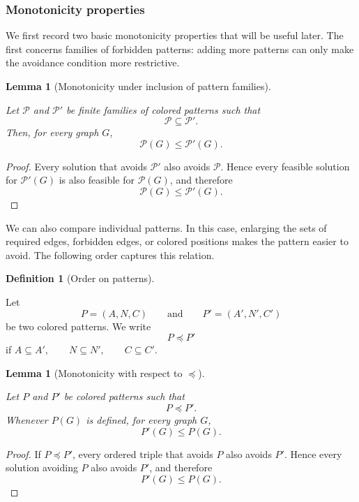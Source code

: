 \documentclass[12pt]{article}
\theoremstyle{plain}
\newtheorem{lemma}[theorem]{Lemma}
\theoremstyle{definition}
\newtheorem{definition}[theorem]{Definition}
\theoremstyle{remark}
\theoremstyle{definition}
\begin{document}
\subsubsection{Monotonicity properties}
\label{subsubsec:monotonicity}

We first record two basic monotonicity properties that will be useful later.
The first concerns families of forbidden patterns: adding more patterns can
only make the avoidance condition more restrictive.


\begin{lemma}[Monotonicity under inclusion of pattern families]
\label{lem:monotone-patterns}

Let \(\mathcal P\) and \(\mathcal P'\) be finite families of colored patterns
such that
\[
\mathcal P\subseteq\mathcal P'.
\]
Then, for every graph \(G\),
\[
\mathcal P(G)\le \mathcal P'(G).
\]
\end{lemma}

\begin{proof}
Every solution that avoids \(\mathcal P'\) also avoids \(\mathcal P\).
Hence every feasible solution for \(\mathcal P'(G)\) is also feasible for
\(\mathcal P(G)\), and therefore
\[
\mathcal P(G)\le \mathcal P'(G).
\]
\end{proof}



We can also compare individual patterns. In this case, enlarging the sets of
required edges, forbidden edges, or colored positions makes the pattern
easier to avoid. The following order captures this relation.


\begin{definition}[Order on patterns]
\label{def:pat-order}

Let
\[
P=(A,N,C)
\qquad\text{and}\qquad
P'=(A',N',C')
\]
be two colored patterns. We write
\[
P\preceq P'
\]
if
\(
A\subseteq A',
\qquad
N\subseteq N',
\qquad
C\subseteq C'.
\)
\end{definition}


\begin{lemma}[Monotonicity with respect to \(\preceq\)]
\label{lem:pat-monotone}

Let \(P\) and \(P'\) be colored patterns such that
\[
P\preceq P'.
\]
Whenever \(P(G)\) is defined, for every graph \(G\),
\[
P'(G)\le P(G).
\]
\end{lemma}

\begin{proof}
If \(P\preceq P'\), every ordered triple that avoids \(P\) also avoids
\(P'\). Hence every solution avoiding \(P\) also avoids \(P'\), and therefore
\[
P'(G)\le P(G).
\]
\end{proof}
\end{document}
